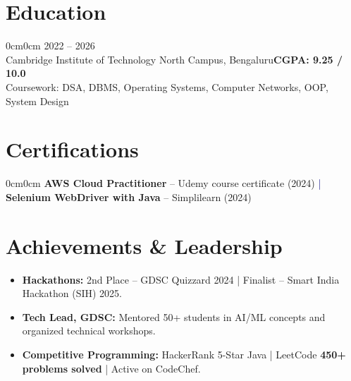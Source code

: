 \documentclass[10pt, letterpaper]{article}
\newenvironment{onecolentry}{%
  \begin{adjustwidth}{0cm}{0cm}}{%
  \end{adjustwidth}}
\newenvironment{highlights}{%
  \begin{itemize}[
    topsep=0.5pt, parsep=0pt, partopsep=0pt,
    itemsep=0.5pt, leftmargin=12pt,
    label={\textcolor{navy}{\small$\circ$}}
  ]%
  \fontsize{9.5pt}{12pt}\selectfont
}{%
  \end{itemize}%
}
\begin{document}
\vspace{1.2mm}

\section{Education}
\begin{onecolentry}
\hfill{\fontsize{9pt}{11pt}\selectfont\textcolor{muted}{2022 -- 2026}}\\[1pt]
{\fontsize{9pt}{11pt}\selectfont\textcolor{navymid}{Cambridge Institute of Technology North Campus, Bengaluru}}\hfill{\fontsize{9pt}{11pt}\selectfont\textbf{CGPA: 9.25 / 10.0}}\\[2pt]
{\fontsize{9pt}{11pt}\selectfont\textcolor{muted}{Coursework: DSA, DBMS, Operating Systems, Computer Networks, OOP, System Design}}
\end{onecolentry}

\vspace{1.2mm}
\section{Certifications}
\begin{onecolentry}
{\fontsize{9pt}{11pt}\selectfont
  \textbf{AWS Cloud Practitioner} -- Udemy course certificate (2024)
  \enspace\textcolor{navy}{|}\enspace
  \textbf{Selenium WebDriver with Java} -- Simplilearn (2024)
}
\end{onecolentry}
\vspace{1.2mm}
\section{Achievements \& Leadership}
\begin{highlights}
  \item \textbf{Hackathons:} 2nd Place -- GDSC Quizzard 2024 | Finalist -- Smart India Hackathon (SIH) 2025.
  \item \textbf{Tech Lead, GDSC:} Mentored 50+ students in AI/ML concepts and organized technical workshops.
  \item \textbf{Competitive Programming:} HackerRank 5-Star Java | LeetCode \textbf{450+ problems solved} | Active on CodeChef.
\end{highlights}
\end{document}
